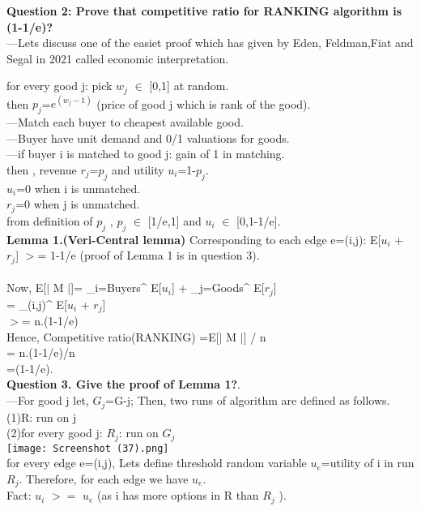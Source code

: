 \documentclass[conference,compsoc]{IEEEtran}
\begin{document}
\par
\textbf{Question 2: Prove that competitive ratio for RANKING algorithm is (1-1/e)?} \\
---Lets discuss one of the easiet proof which has given by Eden, Feldman,Fiat and Segal in 2021 called economic interpretation.\\
\par
for every good j: pick $w_j$ $\in$ [0,1] at random.\\
then  $p_j$=$e^(w_j -1)$ (price of good j which is rank of the good). \\
---Match each buyer to cheapest available good.\\
---Buyer have unit demand and 0/1 valuations for goods.\\
---if buyer i is matched to good j: gain of 1 in matching.\\
then , revenue $r_j$=$p_j$ and utility $u_i$=1-$p_j$.\\
$u_i$=0 when i is unmatched.\\
$r_j$=0 when j is unmatched.\\
from definition of $p_j$ , $p_j$ $\in$ [1/e,1] and $u_i$ $\in$ [0,1-1/e].\\

\textbf{Lemma 1.(Veri-Central lemma)} Corresponding to each edge e=(i,j):
E[$u_i$ + $r_j$] $>$= 1-1/e (proof of Lemma 1 is in question 3).\\
\\
Now, E[$|$ M $|$]=  \sum_{i=Buyers}^{} E[$u_i$]  +  \sum_{j=Goods}^{} E[$r_j$]\\
                   =  \sum_{(i,j)}^{} E[$u_i$ + $r_j$] \\
                  $>$= n.(1-1/e) 
\\
Hence, Competitive ratio(RANKING) =E[$|$ M $|$] / n \\
                                = n.(1-1/e)/n \\
                                  =(1-1/e).\\
                                  
\textbf{Question 3. Give the proof of Lemma 1?}.\\

---For good j let, $G_j$=G-j;
Then, two runs of algorithm are defined as follows.\\
(1)R: run on j\\
(2)for every good j: 
                 $R_j$: run on $G_j$
\\
\texttt{[image: Screenshot (37).png]}
\\
for every edge e=(i,j), Lets define threshold random variable $u_e$=utility of i in run $R_j$. Therefore, for each edge we have $u_e$.\\
Fact: $u_i$ $>=$ $u_e$ (as i has more options in R than $R_j$ ).\\
\end{document}
